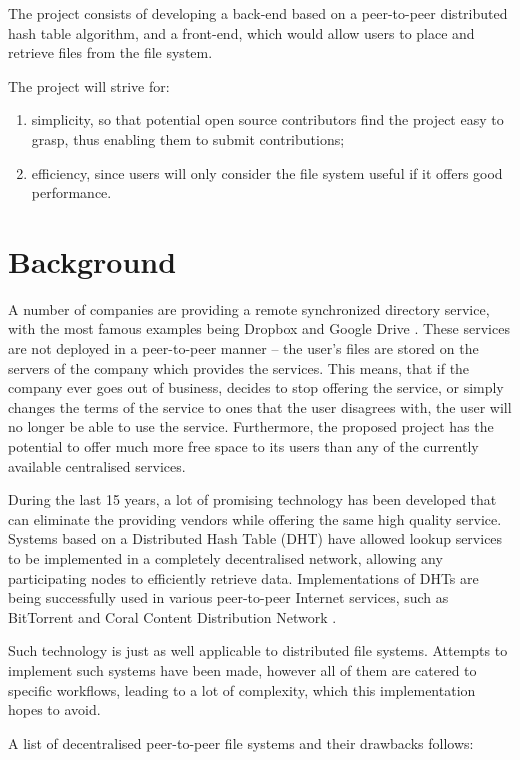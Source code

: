\documentclass[a4paper, 11pt]{article}
\begin{document}
The project consists of developing a back-end based on a peer-to-peer distributed hash table algorithm, and a front-end, which would allow users to place and retrieve files from the file system.

The project will strive for:
\begin{enumerate}
\item simplicity, so that potential open source contributors find the project easy to grasp, thus enabling them to submit contributions;
\item efficiency, since users will only consider the file system useful if it offers good performance.
\end{enumerate}

\section{Background}

A number of companies are providing a remote synchronized directory service, with the most famous examples being Dropbox \cite{dropbox} and Google Drive \cite{gdrive}. These services are not deployed in a peer-to-peer manner -- the user's files are stored on the servers of the company which provides the services. This means, that if the company ever goes out of business, decides to stop offering the service, or simply changes the terms of the service to ones that the user disagrees with, the user will no longer be able to use the service. 
Furthermore, the proposed project has the potential to offer much more free space to its users than any of the currently available centralised services.

During the last 15 years, a lot of promising technology has been developed that can eliminate the providing vendors while offering the same high quality service. 
Systems based on a Distributed Hash Table (DHT) have allowed lookup services to be implemented in a completely decentralised network, allowing any participating nodes to efficiently retrieve data. Implementations of DHTs are being successfully used in various peer-to-peer Internet services, such as BitTorrent and Coral Content Distribution Network \cite{coral}.

Such technology is just as well applicable to distributed file systems. Attempts to implement such systems have been made, however all of them are catered to specific workflows, leading to a lot of complexity, which this implementation hopes to avoid.

A list of decentralised peer-to-peer file systems and their drawbacks follows:
\end{document}
